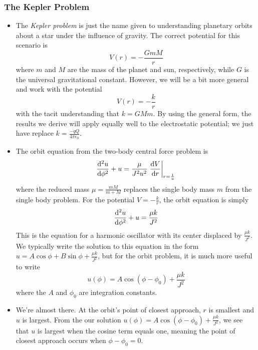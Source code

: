\documentclass[11pt, a4paper]{article}
\begin{document}
\subsubsection{The Kepler Problem}
\begin{itemize}
	\item The \textit{Kepler problem} is just the name given to understanding planetary orbits about a star under the influence of gravity. The correct potential for this scenario is
	\begin{equation*}
		V(r) = -\frac{GmM}{r}
	\end{equation*}
	where $ m $ and $ M $ are the mass of the planet and sun, respectively, while $ G $ is the universal gravitational constant. However, we will be a bit more general and  work with the potential
	\begin{equation*}
		V(r) = - \frac{k}{r}
	\end{equation*}
	with the tacit understanding that $ k = GMm $. By using the general form, the results we derive will apply equally well to the electrostatic potential; we just have replace $ k = \frac{-qQ}{4\pi \epsilon_{0}} $.
	
	\item The orbit equation from the two-body central force problem is
	\begin{equation*}
		\dv[2]{u}{\phi} + u = \frac{\mu}{J^{2}u^{2}} \eval{\dv{V}{r}}_{r = \frac{1}{u}}
	\end{equation*}
	where the reduced mass $ \mu = \frac{mM}{m + M}$ replaces the single body mass $ m $ from the single body problem. For the potential $ V = -\frac{k}{r} $, the orbit equation is simply
	\begin{equation*}
		\dv[2]{u}{\phi} + u = \frac{\mu k}{J^{2}}
	\end{equation*}
	This is the equation for a harmonic oscillator with its center displaced by $ \frac{\mu k}{J^{2}} $. We typically write the solution to this equation in the form $ u = A \cos \phi + B \sin \phi + \frac{\mu k}{J^{2}}$, but for the orbit problem, it is much more useful to write
	\begin{equation*}
		u(\phi) = A \cos(\phi - \phi_{0}) + \frac{\mu k}{J^{2}}
	\end{equation*}
	where the $ A $ and $ \phi_{0} $ are integration constants.
	
	\item We're almost there. At the orbit's point of closest approach, $ r $ is smallest and $ u $ is largest. From the our solution $ u(\phi) = A \cos(\phi - \phi_{0}) + \frac{\mu k}{J^{2}} $, we see that $ u $ is largest when the cosine term equals one, meaning the point of closest approach occurs when $ \phi - \phi_{0} = 0$. 
	

\end{itemize}
\end{document}
